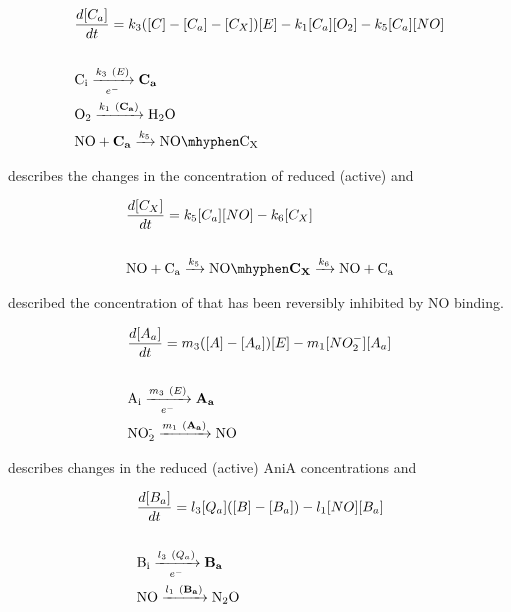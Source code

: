 \begin{eqnarray}
&\frac{d[C_a]}{dt} = k_3([C] - [C_a] - [C_X])[E] - k_{1}[C_a][O_2] - k_5[C_a][NO] \nonumber \\\nonumber \\
&\textnormal{C$_\textnormal{i}$} \xrightarrow[e^-]{k_3~(E)} \mathbf{C_a} \nonumber \\
&\textnormal{O$_\textnormal{2}$} \xrightarrow{k_1~(\mathbf{C_a})} \textnormal{H$_\textnormal{2}$O} \nonumber \\
&\textnormal{NO} + \mathbf{C_a} \xrightarrow{k_5} \textnormal{NO}\mhyphen \textnormal{C$_\textnormal{X}$}
\label{eq:active_cbb3}
\end{eqnarray}

describes the changes in the concentration of reduced (active) \cbbthree{} and

\begin{eqnarray}
&\frac{d[C_X]}{dt} = k_5[C_a][NO] - k_6 [C_X] \nonumber \\\nonumber \\
&\textnormal{NO} + \textnormal{C$_\textnormal{a}$} \xrightarrow{k_5} \textnormal{NO}\mhyphen \mathbf{C_X} \xrightarrow{k_6} \textnormal{NO} + \textnormal{C$_\textnormal{a}$}
\label{eq:NO inhibited_cbb3}
\end{eqnarray}

described the concentration of \cbbthree{} that has been reversibly inhibited by NO binding.

\begin{eqnarray}
&\frac{d[A_a]}{dt} = m_3([A] - [A_a])[E]- m_{1}[NO_2^-][A_a] \nonumber \\\nonumber \\
&\textnormal{A$_\textnormal{i}$} \xrightarrow[e^-]{m_3~(E)} \mathbf{A_a} \nonumber \\
&\textnormal{NO$_\textnormal{2}^\textnormal{-}$} \xrightarrow{m_1~(\mathbf{A_a})} \textnormal{NO}
\label{eq:active_ania}
\end{eqnarray}

describes changes in the reduced (active) AniA concentrations and

\begin{eqnarray}
&\frac{d[B_a]}{dt} = l_3[Q_a]([B] - [B_a]) - l_1[NO][B_a] \nonumber \\\nonumber \\
&\textnormal{B$_\textnormal{i}$} \xrightarrow[e^-]{l_3~(Q_a)} \mathbf{B_a} \nonumber \\
&\textnormal{NO} \xrightarrow{l_1~(\mathbf{B_a})} \textnormal{N$_\textnormal{2}$O}
\label{eq:active_norb}
\end{eqnarray}

